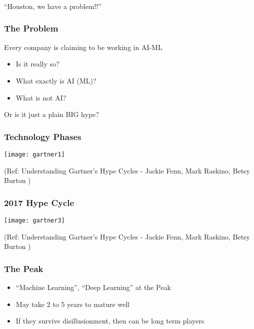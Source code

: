 \begin{frame}[fragile]\frametitle{}
\begin{center}
{\Large ``Houston, we have a problem!!''}
\end{center}
\end{frame}

\begin{frame}[fragile]\frametitle{The Problem}
Every company is claiming to be working in AI-ML
\begin{itemize}
\item Is it really so?
\item What exactly is AI (ML)?
\item What is not AI?
\end{itemize}
Or is it just a plain BIG hype?
\end{frame}


\begin{frame}[fragile]\frametitle{Technology Phases}
\begin{center}
\texttt{[image: gartner1]}
\end{center}
{\tiny (Ref: Understanding Gartner's Hype Cycles - Jackie Fenn, Mark Raskino, Betsy Burton )}
\end{frame}

\begin{frame}[fragile]\frametitle{2017 Hype Cycle}
\begin{center}
\texttt{[image: gartner3]}
\end{center}
{\tiny (Ref: Understanding Gartner's Hype Cycles - Jackie Fenn, Mark Raskino, Betsy Burton )}
\end{frame}


\begin{frame}[fragile]\frametitle{The Peak}
\begin{itemize}
\item ``Machine Learning'', ``Deep Learning'' at the Peak
\item May take 2 to 5 years to mature well
\item If they survive disillusionment, then can be long term players
\end{itemize}
\end{frame}


